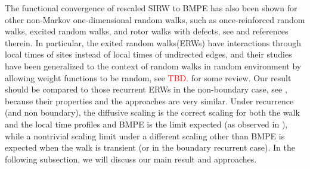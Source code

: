 \documentclass[twoside,12pt,a4paper]{article}
\numberwithin{equation}{section}
\newcommand\TBD{\textcolor{red}{TBD.}}
\begin{document}
	
	The functional convergence of rescaled SIRW to BMPE has also been shown for other non-Markov one-dimensional random walks,
	such as once-reinforced random walks, excited random walks, and rotor walks with defects, see \cite{Dav96,Dav99,DK12,KP16,KMP22B,HLSH18} and references therein. In particular, the exited random walks(ERWs) have interactions through local times of sites instead of local times of undirected edges, and their studies have been generalized to the context of random walks in random environment by allowing weight functions to be random, see \TBD \cite{KZ13, KMP22B}  for some review. Our result should be compared to those recurrent ERWs in the non-boundary case, see \cite{KP16,KMP22B}, because their properties and the approaches are very similar. Under recurrence (and non boundary), the diffusive scaling is the correct scaling for both the walk and the local time profiles and BMPE is the limit expected (as observed in \cite{T96}), while a nontrivial scaling limit under a different scaling other than BMPE is expected when the walk is transient (or in the boundary recurrent case). In the following subsection, we will discuss our main result and approaches.
	
\end{document}
